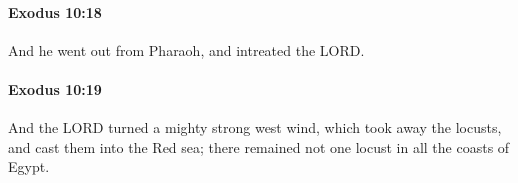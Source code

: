 		\paragraph{Exodus 10:18} %
			\label{EXODUS-10-18}

			And he went out from Pharaoh, and intreated the LORD.


		\paragraph{Exodus 10:19} %
			\label{EXODUS-10-19}

			And the LORD turned a mighty strong west wind, which took away the locusts, and cast them into the Red sea; there remained not one locust in all the coasts of Egypt.


